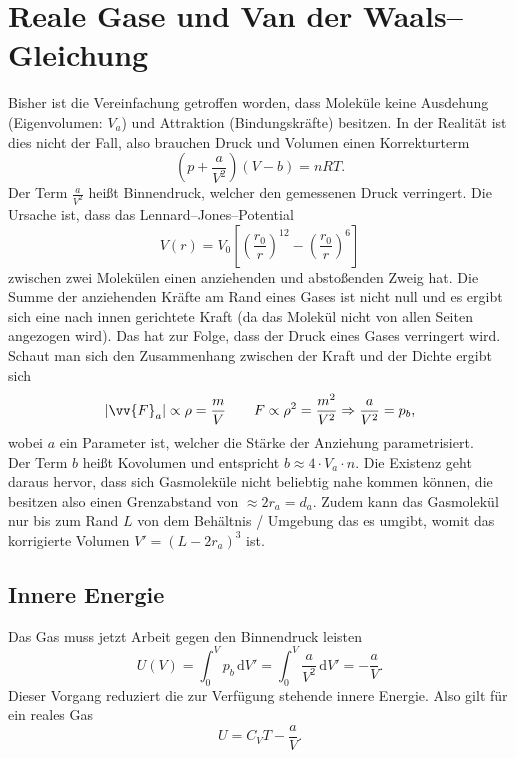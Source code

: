 \documentclass[a4paper,12pt]{article}
\newcommand{\td}{\,\text{d}}
\begin{document}
\section{Reale Gase und Van der Waals--Gleichung}
Bisher ist die Vereinfachung getroffen worden, dass Moleküle keine Ausdehung (Eigenvolumen: $V_a$) und Attraktion (Bindungskräfte) besitzen. In der Realität ist dies nicht der Fall, also brauchen Druck und Volumen einen Korrekturterm
\[ 
        \left(p+\dfrac{a}{V^2}\right)\left(V-b\right)=nRT
.\] 
Der Term $\tfrac{a}{V^2}$ heißt Binnendruck, welcher den gemessenen Druck verringert. Die Ursache ist, dass das Lennard--Jones--Potential 
\[ 
        V(r)=V_0\left[\left(\dfrac{r_0}{r}\right)^{12}-\left(\dfrac{r_0}{r}\right)^{6}\right]
\] 
zwischen zwei Molekülen einen anziehenden und abstoßenden Zweig hat. Die Summe der anziehenden Kräfte am Rand eines Gases ist nicht null und es ergibt sich eine nach innen gerichtete Kraft (da das Molekül nicht von allen Seiten angezogen wird). Das hat zur Folge, dass der Druck eines Gases verringert wird. Schaut man sich den Zusammenhang zwischen der Kraft und der Dichte ergibt sich
\[ 
        |\vv{F}_a|\propto \rho =\dfrac{m}{V}\qquad F\propto \rho ^2=\dfrac{m^2}{V^2}\Rightarrow \dfrac{a}{V^2}=p_b
,\]
wobei $a$ ein Parameter ist, welcher die Stärke der Anziehung parametrisiert.\\\indent
Der Term $b$ heißt Kovolumen und entspricht $b\approx 4\cdot V_a\cdot n$. Die Existenz geht daraus hervor, dass sich Gasmoleküle nicht beliebtig nahe kommen können, die besitzen also einen Grenzabstand von $\approx 2r_a=d_a$. Zudem kann das Gasmolekül nur bis zum Rand $L$ von dem Behältnis / Umgebung das es umgibt, womit das korrigierte Volumen $V'=\left(L-2r_a\right)^3$ ist.

\subsection{Innere Energie}
Das Gas muss jetzt Arbeit gegen den Binnendruck leisten
\[ 
        U(V)=\int_{0}^{V}p_b\td V'=\int_{0}^{V}\dfrac{a}{V^2}\td V'=-\dfrac{a}{V}
.\] 
Dieser Vorgang reduziert die zur Verfügung stehende innere Energie. Also gilt für ein reales Gas
\[ 
        U=C_VT-\dfrac{a}{V}
.\] 
\end{document}

